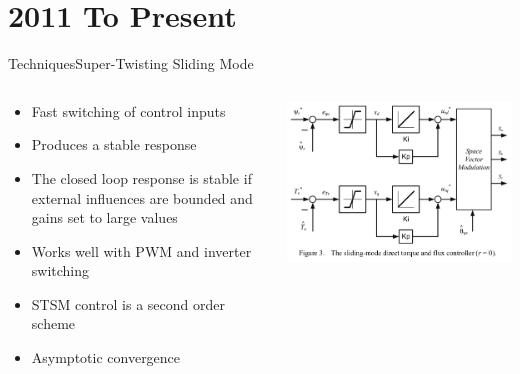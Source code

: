 \documentclass{beamer}
\begin{document}
\section[Techniques]{2011 To Present}
\begin{frame}{Techniques}{Super-Twisting Sliding Mode\cite{6954103}}\begin{small}
\begin{columns}
    \begin{column}{0.47\textwidth}
        \begin{itemize}
	\item Fast switching of control inputs
	\item Produces a stable response
	\item The closed loop response is stable if external influences are bounded and gains set to large values
	\item Works well with PWM and inverter switching
	\item STSM control is a second order scheme
	\item Asymptotic convergence
        \end{itemize}
    \end{column}
    \begin{column}{0.5\textwidth}
        \includegraphics[scale=.25]{./images/direct_torque_flux_controller.png}
    \end{column}
\end{columns}\end{small}
\end{frame}
\end{document}
